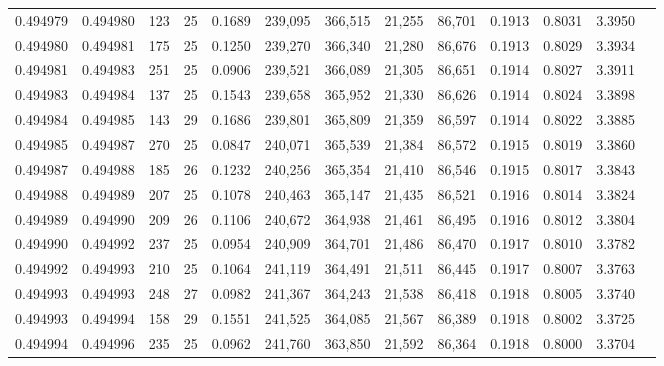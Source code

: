 \begin{tabular}{rrrrrrrrrrrrr}
0.494979 & 0.494980 & 123 &  25 &                                     0.1689 & 239,095 & 366,515 &  21,255 &  86,701 & 0.1913 & 0.8031 & 3.3950 \\
0.494980 & 0.494981 & 175 &  25 &                                     0.1250 & 239,270 & 366,340 &  21,280 &  86,676 & 0.1913 & 0.8029 & 3.3934 \\
0.494981 & 0.494983 & 251 &  25 &                                     0.0906 & 239,521 & 366,089 &  21,305 &  86,651 & 0.1914 & 0.8027 & 3.3911 \\
0.494983 & 0.494984 & 137 &  25 &                                     0.1543 & 239,658 & 365,952 &  21,330 &  86,626 & 0.1914 & 0.8024 & 3.3898 \\
0.494984 & 0.494985 & 143 &  29 &                                     0.1686 & 239,801 & 365,809 &  21,359 &  86,597 & 0.1914 & 0.8022 & 3.3885 \\
0.494985 & 0.494987 & 270 &  25 &                                     0.0847 & 240,071 & 365,539 &  21,384 &  86,572 & 0.1915 & 0.8019 & 3.3860 \\
0.494987 & 0.494988 & 185 &  26 &                                     0.1232 & 240,256 & 365,354 &  21,410 &  86,546 & 0.1915 & 0.8017 & 3.3843 \\
0.494988 & 0.494989 & 207 &  25 &                                     0.1078 & 240,463 & 365,147 &  21,435 &  86,521 & 0.1916 & 0.8014 & 3.3824 \\
0.494989 & 0.494990 & 209 &  26 &                                     0.1106 & 240,672 & 364,938 &  21,461 &  86,495 & 0.1916 & 0.8012 & 3.3804 \\
0.494990 & 0.494992 & 237 &  25 &                                     0.0954 & 240,909 & 364,701 &  21,486 &  86,470 & 0.1917 & 0.8010 & 3.3782 \\
0.494992 & 0.494993 & 210 &  25 &                                     0.1064 & 241,119 & 364,491 &  21,511 &  86,445 & 0.1917 & 0.8007 & 3.3763 \\
0.494993 & 0.494993 & 248 &  27 &                                     0.0982 & 241,367 & 364,243 &  21,538 &  86,418 & 0.1918 & 0.8005 & 3.3740 \\
0.494993 & 0.494994 & 158 &  29 &                                     0.1551 & 241,525 & 364,085 &  21,567 &  86,389 & 0.1918 & 0.8002 & 3.3725 \\
0.494994 & 0.494996 & 235 &  25 &                                     0.0962 & 241,760 & 363,850 &  21,592 &  86,364 & 0.1918 & 0.8000 & 3.3704 \\

\end{tabular}
